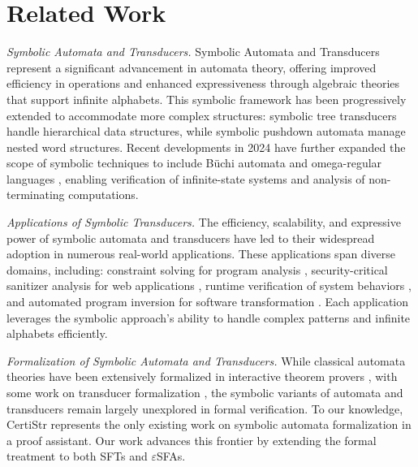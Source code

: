 \documentclass[sigplan,10pt,anonymous,review]{acmart}\settopmatter{printfolios=true,printccs=false,printacmref=false}
\begin{document}
\section{Related Work}
\label{sec:related-work}

\emph{Symbolic Automata and Transducers.} Symbolic Automata and Transducers \cite{cav/DAntoniV17,VeanesHLMB12Transducer, popl/DAntoniV14, entcs/DAntoniKW18, sofsem/TammV18} represent a significant advancement in automata theory, offering improved efficiency in operations and enhanced expressiveness through algebraic theories that support infinite alphabets. This symbolic framework has been progressively extended to accommodate more complex structures: symbolic tree transducers \cite{ershov/VeanesB11} handle hierarchical data structures, while symbolic pushdown automata \cite{cav/DAntoniA14} manage nested word structures. Recent developments in 2024 have further expanded the scope of symbolic techniques to include B\"{u}chi automata and omega-regular languages \cite{pacmpl/VeanesBEZ25}, enabling verification of infinite-state systems and analysis of non-terminating computations.

\emph{Applications of Symbolic Transducers.} The efficiency, scalability, and expressive power of symbolic automata and transducers have led to their widespread adoption in numerous real-world applications. These applications span diverse domains, including: constraint solving for program analysis \cite{lpar/VeanesBM10}, security-critical sanitizer analysis for web applications \cite{uss/HooimeijerLMSV11}, runtime verification of system behaviors \cite{osdi/YaseenABCL20}, and automated program inversion for software transformation \cite{pldi/HuD17}. Each application leverages the symbolic approach's ability to handle complex patterns and infinite alphabets efficiently.

\emph{Formalization of Symbolic Automata and Transducers.} While classical automata theories have been extensively formalized in interactive theorem provers \cite{Tuerk-NFA, Lammich2014TheCA, Peter14, cpp/DoczkalKS13}, with some work on transducer formalization \cite{afp/LochmannFSTS21}, the symbolic variants of automata and transducers remain largely unexplored in formal verification. To our knowledge, CertiStr \cite{cpp/KanLRS22} represents the only existing work on symbolic automata formalization in a proof assistant. Our work advances this frontier by extending the formal treatment to both SFTs and $\varepsilon$SFAs.
\end{document}
